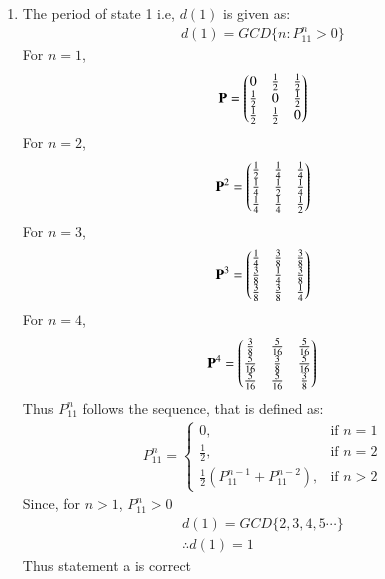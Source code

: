     \begin{enumerate}
    \item{ The period of state 1 i.e, $d(1)$ is given as:
    \begin{align}
    d(1)=GCD\{n : P_{11}^n > 0\} \label{eq:solutions/2018/june/105/eq1a}
    \end{align}
     For $n=1$,
    \begin{align}
    \mathbf{P}=\begin{pmatrix}0&\frac{1}{2}&\frac{1}{2}\\\frac{1}{2}&0&\frac{1}{2}\\\frac{1}{2}&\frac{1}{2}&0\end{pmatrix}\\
    \end{align}
    For $n=2$,
    \begin{align}
    \mathbf{P}^2=\begin{pmatrix}\frac{1}{2}&\frac{1}{4}&\frac{1}{4}\\\frac{1}{4}&\frac{1}{2}&\frac{1}{4}\\\frac{1}{4}&\frac{1}{4}&\frac{1}{2}\end{pmatrix}\\
    \end{align}
    For $n=3$,
    \begin{align}
    \mathbf{P}^3=\begin{pmatrix}\frac{1}{4}&\frac{3}{8}&\frac{3}{8}\\\frac{3}{8}&\frac{1}{4}&\frac{3}{8}\\\frac{3}{8}&\frac{3}{8}&\frac{1}{4}\end{pmatrix}\\
    \end{align}
        For $n=4$,
    \begin{align}
    \mathbf{P}^4=\begin{pmatrix}\frac{3}{8}&\frac{5}{16}&\frac{5}{16}\\\frac{5}{16}&\frac{3}{8}&\frac{5}{16}\\\frac{5}{16}&\frac{5}{16}&\frac{3}{8}\end{pmatrix}
    \end{align}
Thus $P_{11}^n$ follows the sequence, that is defined as:
\begin{align}
    P_{11}^n= 
\begin{cases}
	0,& \text{if } n=1\\
    \frac{1}{2},& \text{if } n=2\\
    \frac{1}{2}(P_{11}^{n-1}+P_{11}^{n-2}),& \text{if } n >2
\end{cases}
\end{align}
    Since, for $n>1$, $P_{11}^n>0$
    \begin{align}
    d(1)=GCD\{2,3,4,5\cdots\}\\
    \therefore d(1)=1 \label{eq:solutions/2018/june/105/eq1}
    \end{align}
    Thus statement a is correct}\\

\end{enumerate}
